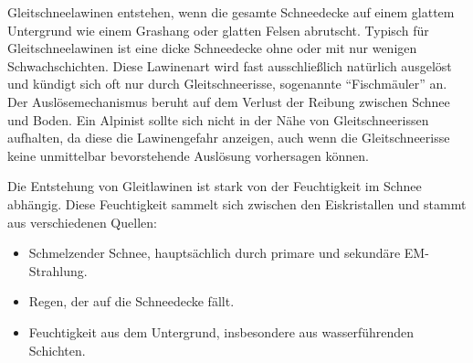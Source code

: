 


Gleitschneelawinen entstehen, wenn die gesamte Schneedecke auf einem glattem Untergrund wie einem Grashang oder glatten Felsen abrutscht. Typisch für Gleitschneelawinen ist eine dicke Schneedecke ohne oder mit nur wenigen Schwachschichten. Diese Lawinenart wird fast ausschließlich natürlich ausgelöst und kündigt sich oft nur durch Gleitschneerisse, sogenannte “Fischmäuler” an. Der Auslösemechanismus beruht auf dem Verlust der Reibung zwischen Schnee und Boden. Ein Alpinist sollte sich nicht in der Nähe von Gleitschneerissen aufhalten, da diese die Lawinengefahr anzeigen, auch wenn die Gleitschneerisse keine unmittelbar bevorstehende Auslösung vorhersagen können.

Die Entstehung von Gleitlawinen ist stark von der Feuchtigkeit im Schnee abhängig. Diese Feuchtigkeit sammelt sich zwischen den Eiskristallen und stammt aus verschiedenen Quellen:

\begin{itemize}
    \item Schmelzender Schnee, hauptsächlich durch primare und sekundäre EM-Strahlung.
    \item Regen, der auf die Schneedecke fällt.
    \item Feuchtigkeit aus dem Untergrund, insbesondere aus wasserführenden Schichten.
\end{itemize}
